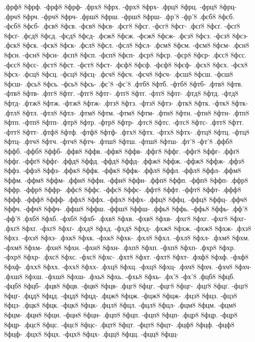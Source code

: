{.фрф8 8фрф. -фрф8 8фрф-
.фрх8 8фрх. -фрх8 8фрх-
.фрц8 8фрц. -фрц8 8фрц-
.фрч8 8фрч. -фрч8 8фрч-
.фрш8 8фрш. -фрш8 8фрш-
.фр'8 -фр'8
.фсб8 8фсб. -фсб8 8фсб-
.фсв8 8фсв. -фсв8 8фсв-
.фсг8 8фсг. -фсг8 8фсг-
.фсґ8 8фсґ. -фсґ8 8фсґ-
.фсд8 8фсд. -фсд8 8фсд-
.фсж8 8фсж. -фсж8 8фсж-
.фсз8 8фсз. -фсз8 8фсз-
.фск8 8фск. -фск8 8фск-
.фсл8 8фсл. -фсл8 8фсл-
.фсм8 8фсм. -фсм8 8фсм-
.фсн8 8фсн. -фсн8 8фсн-
.фсп8 8фсп. -фсп8 8фсп-
.фср8 8фср. -фср8 8фср-
.фсс8 8фсс. -фсс8 8фсс-
.фст8 8фст. -фст8 8фст-
.фсф8 8фсф. -фсф8 8фсф-
.фсх8 8фсх. -фсх8 8фсх-
.фсц8 8фсц. -фсц8 8фсц-
.фсч8 8фсч. -фсч8 8фсч-
.фсш8 8фсш. -фсш8 8фсш-
.фсь8 8фсь. -фсь8 8фсь-
.фс'8 -фс'8
.фтб8 8фтб. -фтб8 8фтб-
.фтв8 8фтв. -фтв8 8фтв-
.фтг8 8фтг. -фтг8 8фтг-
.фтґ8 8фтґ. -фтґ8 8фтґ-
.фтд8 8фтд. -фтд8 8фтд-
.фтж8 8фтж. -фтж8 8фтж-
.фтз8 8фтз. -фтз8 8фтз-
.фтк8 8фтк. -фтк8 8фтк-
.фтл8 8фтл. -фтл8 8фтл-
.фтм8 8фтм. -фтм8 8фтм-
.фтн8 8фтн. -фтн8 8фтн-
.фтп8 8фтп. -фтп8 8фтп-
.фтр8 8фтр. -фтр8 8фтр-
.фтс8 8фтс. -фтс8 8фтс-
.фтт8 8фтт. -фтт8 8фтт-
.фтф8 8фтф. -фтф8 8фтф-
.фтх8 8фтх. -фтх8 8фтх-
.фтц8 8фтц. -фтц8 8фтц-
.фтч8 8фтч. -фтч8 8фтч-
.фтш8 8фтш. -фтш8 8фтш-
.фт'8 -фт'8
.ффб8 8ффб. -ффб8 8ффб-
.ффв8 8ффв. -ффв8 8ффв-
.ффг8 8ффг. -ффг8 8ффг-
.ффґ8 8ффґ. -ффґ8 8ффґ-
.ффд8 8ффд. -ффд8 8ффд-
.ффж8 8ффж. -ффж8 8ффж-
.ффз8 8ффз. -ффз8 8ффз-
.ффк8 8ффк. -ффк8 8ффк-
.ффл8 8ффл. -ффл8 8ффл-
.ффм8 8ффм. -ффм8 8ффм-
.ффн8 8ффн. -ффн8 8ффн-
.ффп8 8ффп. -ффп8 8ффп-
.ффр8 8ффр. -ффр8 8ффр-
.ффс8 8ффс. -ффс8 8ффс-
.ффт8 8ффт. -ффт8 8ффт-
.ффф8 8ффф. -ффф8 8ффф-
.ффх8 8ффх. -ффх8 8ффх-
.ффц8 8ффц. -ффц8 8ффц-
.ффч8 8ффч. -ффч8 8ффч-
.ффш8 8ффш. -ффш8 8ффш-
.ффь8 8ффь. -ффь8 8ффь-
.фф'8 -фф'8
.фхб8 8фхб. -фхб8 8фхб-
.фхв8 8фхв. -фхв8 8фхв-
.фхг8 8фхг. -фхг8 8фхг-
.фхґ8 8фхґ. -фхґ8 8фхґ-
.фхд8 8фхд. -фхд8 8фхд-
.фхж8 8фхж. -фхж8 8фхж-
.фхз8 8фхз. -фхз8 8фхз-
.фхк8 8фхк. -фхк8 8фхк-
.фхл8 8фхл. -фхл8 8фхл-
.фхм8 8фхм. -фхм8 8фхм-
.фхн8 8фхн. -фхн8 8фхн-
.фхп8 8фхп. -фхп8 8фхп-
.фхр8 8фхр. -фхр8 8фхр-
.фхс8 8фхс. -фхс8 8фхс-
.фхт8 8фхт. -фхт8 8фхт-
.фхф8 8фхф. -фхф8 8фхф-
.фхх8 8фхх. -фхх8 8фхх-
.фхц8 8фхц. -фхц8 8фхц-
.фхч8 8фхч. -фхч8 8фхч-
.фхш8 8фхш. -фхш8 8фхш-
.фхь8 8фхь. -фхь8 8фхь-
.фх'8 -фх'8
.фцб8 8фцб. -фцб8 8фцб-
.фцв8 8фцв. -фцв8 8фцв-
.фцг8 8фцг. -фцг8 8фцг-
.фцґ8 8фцґ. -фцґ8 8фцґ-
.фцд8 8фцд. -фцд8 8фцд-
.фцж8 8фцж. -фцж8 8фцж-
.фцз8 8фцз. -фцз8 8фцз-
.фцк8 8фцк. -фцк8 8фцк-
.фцл8 8фцл. -фцл8 8фцл-
.фцм8 8фцм. -фцм8 8фцм-
.фцн8 8фцн. -фцн8 8фцн-
.фцп8 8фцп. -фцп8 8фцп-
.фцр8 8фцр. -фцр8 8фцр-
.фцс8 8фцс. -фцс8 8фцс-
.фцт8 8фцт. -фцт8 8фцт-
.фцф8 8фцф. -фцф8 8фцф-
.фцх8 8фцх. -фцх8 8фцх-
.фцц8 8фцц. -фцц8 8фцц-
}
